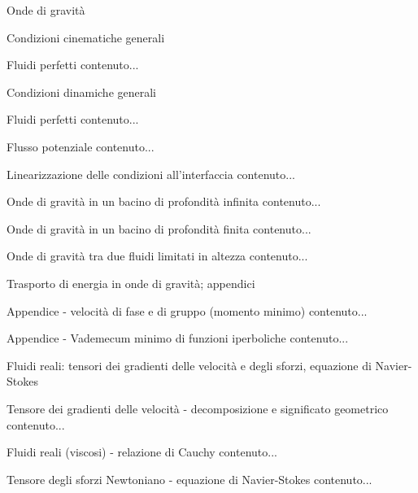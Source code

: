 \documentclass[a4paper,11pt]{report}
\begin{document}
	\begin{chapter}{Onde di gravità}
		\begin{section}{Condizioni cinematiche generali}
			\begin{subsection}{Fluidi perfetti}
				contenuto...
			\end{subsection}
		\end{section}
		\begin{section}{Condizioni dinamiche generali}
			\begin{subsection}{Fluidi perfetti}
				contenuto...
			\end{subsection}
			\begin{subsection}{Flusso potenziale}
				contenuto...
			\end{subsection}
		\end{section}
		\begin{section}{Linearizzazione delle condizioni all'interfaccia}
			contenuto...
		\end{section}
		\begin{section}{Onde di gravità in un bacino di profondità infinita}
			contenuto...
		\end{section}
		\begin{section}{Onde di gravità in un bacino di profondità finita}
			contenuto...
		\end{section}
		\begin{section}{Onde di gravità tra due fluidi limitati in altezza}
			contenuto...
		\end{section}
	\end{chapter}

	\begin{chapter}{Trasporto di energia in onde di gravità; appendici}
		\begin{section}{Appendice - velocità di fase e di gruppo (momento minimo)}
			contenuto...
		\end{section}
		\begin{section}{Appendice - Vademecum minimo di funzioni iperboliche}
			contenuto...
		\end{section}
	\end{chapter}

	\begin{chapter}{Fluidi reali: tensori dei gradienti delle velocità e degli sforzi, equazione di Navier-Stokes}
		\begin{section}{Tensore dei gradienti delle velocità - decomposizione e significato geometrico}
			contenuto...
		\end{section}
		\begin{section}{Fluidi reali (viscosi) - relazione di Cauchy}
			contenuto...
		\end{section}
		\begin{section}{Tensore degli sforzi Newtoniano - equazione di Navier-Stokes}
			contenuto...
		\end{section}
	\end{chapter}
\end{document}
